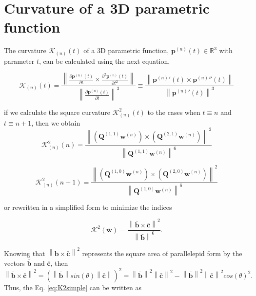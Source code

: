 \section{Curvature of a 3D parametric function}

The curvature $\mathcal{K}_{(n)}(t)$ of a 3D parametric function, 
$\mathbf{p}^{(n)}(t)\in \mathbb{R}^{3}$ with parameter $t$, 
can be calculated 
\cite[pp. 21]{toponogov2006differential} 
using the next equation,

\begin{equation}
\mathcal{K}_{(n)}(t)
=
\frac{\left\|\frac{\partial \mathbf{p}^{(n)}(t)}{\partial t} \times \frac{\partial^2 \mathbf{p}^{(n)}(t)}{\partial t^2} \right\|}
{\left\|\frac{\partial \mathbf{p}^{(n)}(t)}{\partial t}\right\|^{3}}
\equiv
\frac{\left\|{\mathbf{p}^{(n)}}'(t) \times {\mathbf{p}^{(n)}}''(t) \right\|}
{\left\|{\mathbf{p}^{(n)}}'(t)\right\|^{3}}
\end{equation}


if we calculate the square curvature $\mathcal{K}_{(n)}^{2}(t)$ to the cases when $t\equiv n$ and $t\equiv n+1$,
then we obtain
\begin{equation}
\mathcal{K}_{(n)}^{2}(n)
=
\frac{\left\|
\left( \mathbf{Q}^{(1,1)} \mathbf{w}^{(n)} \right)
\times 
\left( \mathbf{Q}^{(2,1)} \mathbf{w}^{(n)} \right)
\right\|^{2}}
{\left\| \mathbf{Q}^{(1,1)} \mathbf{w}^{(n)} \right\|^{6}}
\end{equation}

\begin{equation}
\mathcal{K}_{(n)}^{2}(n+1)
=
\frac{\left\|
\left( \mathbf{Q}^{(1,0)} \mathbf{w}^{(n)} \right)
\times 
\left( \mathbf{Q}^{(2,0)} \mathbf{w}^{(n)} \right)
\right\|^{2}}
{\left\| \mathbf{Q}^{(1,0)} \mathbf{w}^{(n)} \right\|^{6}}
\end{equation}


or rewritten in a simplified form to minimize the indices

\begin{equation}\label{eq:K2simple}
\mathcal{K}^{2}(\mathbf{\bar{w}})
=
\frac{
\left\|
\mathbf{\bar{b}} 
\times 
\mathbf{\bar{c}}
\right\|^{2}
}
{\left\| \mathbf{\bar{b}} \right\|^{6}}.
\end{equation}



Knowing that $\left\|
\mathbf{\bar{b}} 
\times 
\mathbf{\bar{c}}
\right\|^{2}$ 
represents the square area of parallelepid form by the vectors 
$\mathbf{\bar{b}}$ and $\mathbf{\bar{c}}$,
then
$\left\|
\mathbf{\bar{b}} 
\times 
\mathbf{\bar{c}}
\right\|^{2}
=
\left(
\left\|
\mathbf{\bar{b}}
\right\|
sin(\theta) 
\left\|
\mathbf{\bar{c}}
\right\|
\right)^{2}
=
\left\|
\mathbf{\bar{b}}
\right\|^{2}
\left\|
\mathbf{\bar{c}}
\right\|^{2}
-
\left\|
\mathbf{\bar{b}}
\right\|^{2}
\left\|
\mathbf{\bar{c}}
\right\|^{2}
cos(\theta)^{2}.
$ 
Thus, the Eq. \ref{eq:K2simple} can be written as 

